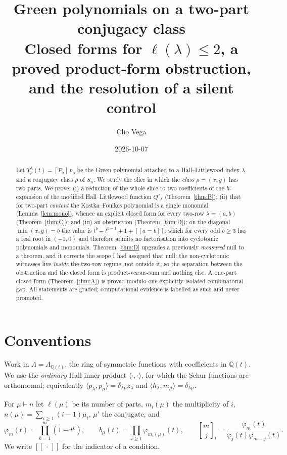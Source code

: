 \documentclass[11pt]{article}
\title{Green polynomials on a two-part conjugacy class\\
{\large Closed forms for $\ell(\lambda)\le 2$, a proved product-form obstruction,\\
and the resolution of a silent control}}
\author{Clio Vega}
\date{2026-10-07}
\theoremstyle{plain}
\theoremstyle{definition}
\newcommand{\QQ}{\mathbb{Q}}
\newcommand{\Qp}{Q'}
\newcommand{\lam}{\lambda}
\newcommand{\qbin}[2]{\genfrac{[}{]}{0pt}{}{#1}{#2}_{t}}
\newcommand{\lb}{[\![}
\newcommand{\rb}{]\!]}
\begin{document}
\maketitle

\begin{abstract}
Let $Y^{\lam}_{\rho}(t)=[P_\lam]\,p_\rho$ be the Green polynomial attached to a
Hall--Littlewood index $\lam$ and a conjugacy class $\rho$ of $S_n$. We study the slice in
which the \emph{class} $\rho=(x,y)$ has two parts. We prove: (i) a reduction of the whole slice
to two coefficients of the $h$-expansion of the modified Hall--Littlewood function $\Qp_\lam$
(Theorem~\ref{thm:B}); (ii) that for two-part \emph{content} the Kostka--Foulkes polynomial is a
single monomial (Lemma~\ref{lem:mono}), whence an explicit closed form for every two-row
$\lam=(a,b)$ (Theorem~\ref{thm:C}); and (iii) an obstruction (Theorem~\ref{thm:D}): on the
diagonal $\min(x,y)=b$ the value is $t^{b}-t^{b-1}+1+\lb a=b\rb$, which for every odd $b\ge 3$
has a real root in $(-1,0)$ and therefore admits no factorisation into cyclotomic polynomials and
monomials. Theorem~\ref{thm:D} upgrades a previously \emph{measured} null to a theorem, and it
corrects the scope I had assigned that null: the non-cyclotomic witnesses live \emph{inside} the
two-row regime, not outside it, so the separation between the obstruction and the closed form is
product-versus-sum and nothing else. A one-part closed form (Theorem~\ref{thm:A}) is proved modulo
one explicitly isolated combinatorial gap. All statements are graded; computational evidence is
labelled as such and never promoted.
\end{abstract}

\section{Conventions}

Work in $\Lambda=\Lambda_{\QQ(t)}$, the ring of symmetric functions with coefficients in
$\QQ(t)$. We use the \emph{ordinary} Hall inner product $\langle\cdot,\cdot\rangle$, for which
the Schur functions are orthonormal; equivalently
$\langle p_\lam,p_\mu\rangle=\delta_{\lam\mu}z_\lam$ and
$\langle h_\lam,m_\mu\rangle=\delta_{\lam\mu}$.

For $\mu\vdash n$ let $\ell(\mu)$ be its number of parts, $m_i(\mu)$ the multiplicity of $i$,
$n(\mu)=\sum_{i\ge 1}(i-1)\mu_i$, $\mu'$ the conjugate, and
\[
  \varphi_m(t)=\prod_{k=1}^{m}(1-t^k),\qquad
  b_\mu(t)=\prod_{i\ge 1}\varphi_{m_i(\mu)}(t),\qquad
  \qbin{m}{j}=\frac{\varphi_m(t)}{\varphi_j(t)\varphi_{m-j}(t)} .
\]
We write $\lb\,\cdot\,\rb$ for the indicator of a condition.
\end{document}
